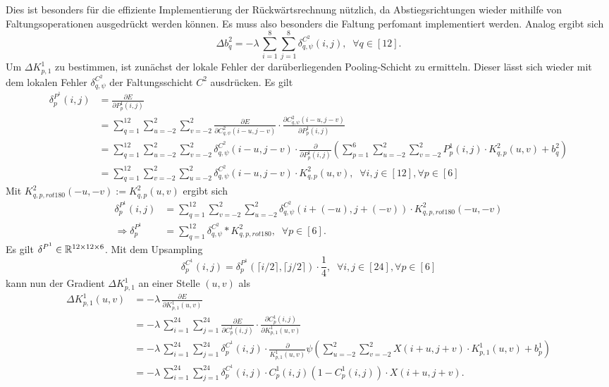 Dies ist besonders für die effiziente Implementierung der Rückwärtsrechnung nützlich, da Abstiegsrichtungen wieder mithilfe von Faltungsoperationen ausgedrückt werden können. Es muss also besonders die Faltung perfomant implementiert werden. Analog ergibt sich 
\begin{equation*}
    \Delta b_q^2= -\lambda \, \sum_{i=1}^8 \sum_{j=1}^8 \delta_{q,\psi}^{C^2}(i,j), \; \; \forall q \in [12].
\end{equation*}
Um $ \Delta K^1_{p,1}$ zu bestimmen, ist zunächst der lokale Fehler der darüberliegenden Pooling-Schicht zu ermitteln. Dieser lässt sich wieder mit dem lokalen Fehler $\delta_{q,\psi}^{C^2}$ der Faltungsschicht $C^2$ ausdrücken. Es gilt 
\begin{align*}
    \delta^{P^1}_{p}(i,j) &= \frac{\partial E}{\partial P^1_{p}(i,j)} \\
    &= \sum_{q=1}^{12} \sum_{u=-2}^2 \sum_{v=-2}^2 \frac{\partial E}{\partial C^2_{q,\psi}(i-u,j-v)} \cdot \frac{\partial C^2_{q,\psi}(i-u,j-v)}{\partial P_{p}^1(i,j)} \\
    &= \sum_{q=1}^{12} \sum_{u=-2}^2 \sum_{v=-2}^2 \delta^{C^2}_{q,\psi}(i-u,j-v) \cdot \frac{\partial}{\partial P_p^1(i,j)}  \left( \sum_{p=1}^6 \sum_{u=-2}^2 \sum_{v=-2}^2 P^1_p(i,j) \cdot K^2_{q,p}(u,v) +b_q^2\right) \\
    &= \sum_{q=1}^{12} \sum_{v=-2}^2 \sum_{u=-2}^2 \delta_{q,\psi}^{C^2}(i-u,j-v) \cdot K^2_{q,p}(u,v), \; \; \forall i,j \in [12], \forall p \in [6]
\end{align*}
Mit $K^2_{q,p,rot180}(-u,-v):=K^2_{q,p}(u,v)$ ergibt sich
\begin{align*}
    \delta^{P^1}_{p}(i,j)&=\sum_{q=1}^{12} \sum_{v=-2}^2 \sum_{u=-2}^2 \delta_{q,\psi}^{C^2}(i+(-u),j+(-v)) \cdot K^2_{q,p,rot180}(-u,-v) \\
    \Rightarrow \delta^{P^1}_{p} &= \sum_{q=1}^{12} \delta_{q, \psi}^{C^2} \ast K_{q,p,rot180}^2, \; \; \forall p \in [6].
    \end{align*}
Es gilt  $\delta^{P^1} \in \mathbb{R}^{12 \times 12 \times 6}$. Mit dem Upsampling
\begin{equation*}
    \delta^{C^1}_p(i,j)= \delta^{P^1}_p \left( \lceil i/2 \rceil, \lceil j/2 \rceil \right) \cdot \frac{1}{4}, \; \; \forall i,j \in [24], \forall p \in [6]
\end{equation*}
kann nun der Gradient $\Delta K^1_{p,1}$ an einer Stelle $(u,v)$ als
\begin{align*}
    \Delta K^1_{p,1}(u,v) &= -\lambda \, \frac{\partial E}{\partial K^1_{p,1}(u,v)} \\
    &= -\lambda \, \sum_{i=1}^{24} \sum_{j=1}^{24} \frac{\partial E}{\partial C^1_p(i,j)} \cdot \frac{\partial C^1_p(i,j)}{\partial K_{p,1}^1(u,v)} \\
    &= -\lambda \, \sum_{i=1}^{24} \sum_{j=1}^{24} \delta_p^{C^1}(i,j) \cdot \frac{\partial}{ K^1_{p,1}(u,v)} \psi \left(\sum_{u=-2}^2 \sum_{v=-2}^2 X(i+u,j+v) \cdot K^1_{p,1}(u,v) +b_p^1\right) \\
    &= -\lambda \, \sum_{i=1}^{24} \sum_{j=1}^{24} \delta_p^{C^1}(i,j) \cdot C_p^1(i,j)\left(1-C_p^1(i,j)\right) \cdot X(i+u,j+v).
\end{align*}
